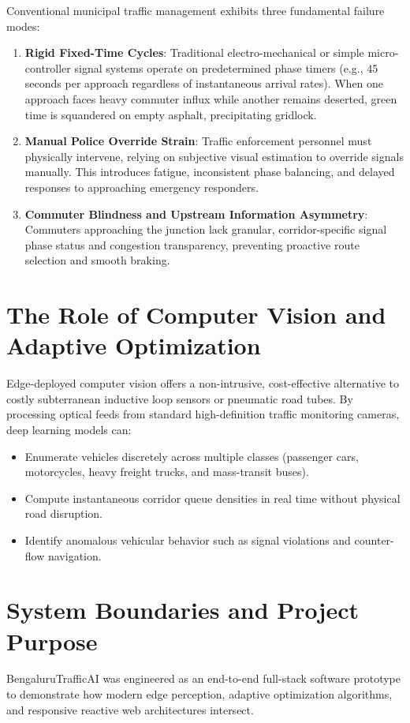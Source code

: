\documentclass[11pt,a4paper,oneside]{report}
\begin{document}
Conventional municipal traffic management exhibits three fundamental failure modes:
\begin{enumerate}[leftmargin=*]
    \item \textbf{Rigid Fixed-Time Cycles}: Traditional electro-mechanical or simple micro-controller signal systems operate on predetermined phase timers (e.g., 45 seconds per approach regardless of instantaneous arrival rates). When one approach faces heavy commuter influx while another remains deserted, green time is squandered on empty asphalt, precipitating gridlock.
    \item \textbf{Manual Police Override Strain}: Traffic enforcement personnel must physically intervene, relying on subjective visual estimation to override signals manually. This introduces fatigue, inconsistent phase balancing, and delayed responses to approaching emergency responders.
    \item \textbf{Commuter Blindness and Upstream Information Asymmetry}: Commuters approaching the junction lack granular, corridor-specific signal phase status and congestion transparency, preventing proactive route selection and smooth braking.
\end{enumerate}

\section{The Role of Computer Vision and Adaptive Optimization}
Edge-deployed computer vision offers a non-intrusive, cost-effective alternative to costly subterranean inductive loop sensors or pneumatic road tubes. By processing optical feeds from standard high-definition traffic monitoring cameras, deep learning models can:
\begin{itemize}[leftmargin=*]
    \item Enumerate vehicles discretely across multiple classes (passenger cars, motorcycles, heavy freight trucks, and mass-transit buses).
    \item Compute instantaneous corridor queue densities in real time without physical road disruption.
    \item Identify anomalous vehicular behavior such as signal violations and counter-flow navigation.
\end{itemize}

\section{System Boundaries and Project Purpose}
BengaluruTrafficAI was engineered as an end-to-end full-stack software prototype to demonstrate how modern edge perception, adaptive optimization algorithms, and responsive reactive web architectures intersect.
\end{document}
